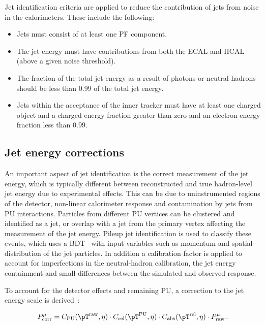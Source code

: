 Jet identification criteria are applied to reduce the contribution of jets from
noise in the calorimeters. These include the following:
\begin{itemize}
\item Jets must consist of at least one \ac{PF} component. 
\item The jet energy must have contributions
from both the \ac{ECAL} and \ac{HCAL} (above a given noise threshold).
\item The fraction of the total jet energy as a result of photons or neutral
hadrons should be less than 0.99 of the total jet energy.
\item Jets within the acceptance of the inner tracker must have at least one
charged object and a charged energy fraction greater than zero and an electron
energy fraction less than 0.99. 
\end{itemize}

\subsection{Jet energy corrections}
\label{sec:JEC}

An important aspect of jet identification is the correct measurement of the jet
energy, which is typically different between reconstructed and true hadron-level jet energy
due to experimental effects. This can be due to uninstrumented regions of the
detector, non-linear calorimeter response and contamination by jets from \ac{PU}
interactions. Particles from different \ac{PU} vertices can be clustered and identified as a
jet, or overlap with a jet from the primary vertex affecting the measurement of the jet energy.
Pileup jet identification \cite{CMS-PAS-JME-13-005} is used to classify these events, which uses a 
\ac{BDT}~\cite{TMVA} with input variables such as
momentum and spatial distribution of the jet particles. In addition
a calibration factor is applied to account for imperfections in the
neutral-hadron calibration, the jet energy containment and small differences
between the simulated and observed response.

To account for the detector effects and remaining \ac{PU}, a correction to the jet energy
scale is derived~\cite{CMS-JME-10-011}:


\begin{equation}
P_{\text{corr}}^{\mu} = C_{\text{PU}}(\pT^{\text{raw}},\eta) \cdot
C_{\text{rel}}(\pT^{\text{PU}},\eta) \cdot C_{\text{abs}}(\pT^{\text{rel}},\eta) \cdot
P_{\text{raw}}^{\mu}\, .
\end{equation}

